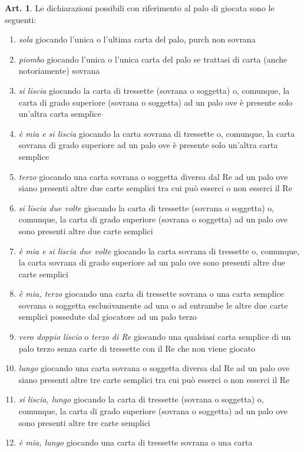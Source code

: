 \documentclass[italian,a4paper]{article}
\theoremstyle{definition}
\newtheorem{art}{Art.}
\begin{document}
\begin{art}
Le dichiarazioni possibili con riferimento al palo di giocata sono le seguenti:
\begin{enumerate}
\item        \emph{sola} giocando l’unica o l’ultima carta del palo, purch non
sovrana
\item        \emph{piombo} giocando l’unica o l’unica carta del palo se trattasi di
carta (anche notoriamente) sovrana
\item        \emph{si liscia} giocando la carta di tressette (sovrana o soggetta) o,
comunque, la carta di grado superiore (sovrana o soggetta) ad un palo ove è
presente solo un’altra carta semplice
\item        \emph{è mia e si liscia} giocando la carta sovrana di tressette o,
comunque, la carta sovrana di grado superiore ad un palo ove è presente solo
un’altra carta semplice
\item        \emph{terzo} giocando una carta sovrana o soggetta diversa dal Re ad un
palo ove siano presenti altre due carte semplici tra cui può esserci o non
esserci il Re
\item       \emph{si liscia due volte} giocando la carta di tressette (sovrana o
soggetta) o, comunque, la carta di grado superiore (sovrana o soggetta) ad
un palo ove sono  presenti altre due carte semplici
\item        \emph{è mia e si liscia due volte} giocando la carta sovrana di
tressette o, comunque, la carta sovrana di grado superiore ad un palo ove
sono presenti altre due carte semplici
\item       \emph{è mia, terzo} giocando una carta di tressette sovrana o una carta
semplice sovrana o soggetta esclusivamente ad una o ad entrambe le altre due
carte semplici possedute dal giocatore ad un palo terzo 
\item        \emph{vero doppio liscio} o \emph{terzo di Re} giocando una qualsiasi carta
semplice di un palo terzo senza carte di tressette con il Re che non viene
giocato
\item      \emph{lungo} giocando una carta sovrana o soggetta diversa dal Re ad un
palo ove siano presenti altre tre carte semplici tra cui può esserci o non
esserci il Re
\item     \emph{si liscia, lungo} giocando la carta di tressette (sovrana o
soggetta) o, comunque, la carta di grado superiore (sovrana o soggetta) ad
un palo ove sono  presenti altre tre carte semplici
\item      \emph{è mia, lungo} giocando una carta di tressette sovrana o una carta

\end{enumerate}
\end{art}
\end{document}
